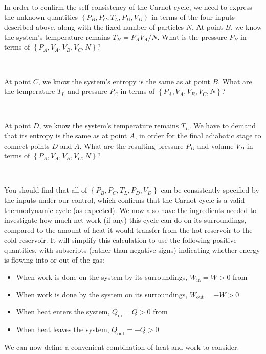 In order to confirm the self-consistency of the Carnot cycle, we need to express the unknown quantities $\left\{P_B, P_C, T_L, P_D, V_D\right\}$ in terms of the four inputs described above, along with the fixed number of particles $N$.
At point $B$, we know the system's temperature remains $T_H = P_A V_A / N$.
What is the pressure $P_B$ in terms of $\left\{P_A, V_A, V_B, V_C, N\right\}$?
\begin{mdframed}
  \ \\[100 pt]
\end{mdframed}

\newpage %
At point $C$, we know the system's entropy is the same as at point $B$.
What are the temperature $T_L$ and pressure $P_C$ in terms of $\left\{P_A, V_A, V_B, V_C, N\right\}$?
\begin{mdframed}
  \ \\[100 pt]
\end{mdframed}

At point $D$, we know the system's temperature remains $T_L$.
We have to demand that its entropy is the same as at point $A$, in order for the final adiabatic stage to connect points $D$ and $A$.
What are the resulting pressure $P_D$ and volume $V_D$ in terms of $\left\{P_A, V_A, V_B, V_C, N\right\}$?
\begin{mdframed}
  \ \\[100 pt]
\end{mdframed}

You should find that all of $\left\{P_B, P_C, T_L, P_D, V_D\right\}$ can be consistently specified by the inputs under our control, which confirms that the Carnot cycle is a valid thermodynamic cycle (as expected).
We now also have the ingredients needed to investigate how much net work (if any) this cycle can do on its surroundings, compared to the amount of heat it would transfer from the hot reservoir to the cold reservoir.
It will simplify this calculation to use the following positive quantities, with subscripts (rather than negative signs) indicating whether energy is flowing into or out of the gas: \\[-25 pt]
\begin{itemize}
  \setlength{\itemsep}{6pt}
  \setlength{\parskip}{0pt}
  \setlength{\parsep}{0pt}
  \item When work is done on the system by its surroundings, $W_{\text{in}} = W > 0$ from 
  \item When work is done by the system on its surroundings, $W_{\text{out}} = -W > 0$
  \item When heat enters the system, $Q_{\text{in}} = Q > 0$ from 
  \item When heat leaves the system, $Q_{\text{out}} = -Q > 0$ \\[-25 pt]
\end{itemize}
We can now define a convenient combination of heat and work to consider.

